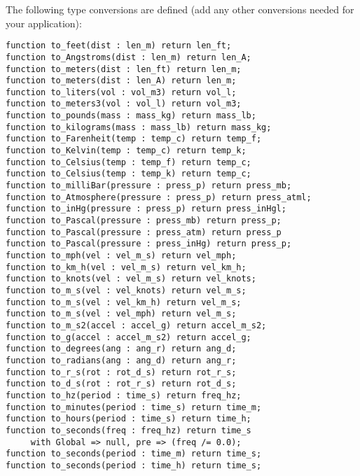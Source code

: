 \documentclass[10pt, openany]{book}
\begin{document}
The following type conversions are defined (add any other conversions needed for your application):
\begin{lstlisting}
function to_feet(dist : len_m) return len_ft;
function to_Angstroms(dist : len_m) return len_A;
function to_meters(dist : len_ft) return len_m;
function to_meters(dist : len_A) return len_m;
function to_liters(vol : vol_m3) return vol_l;
function to_meters3(vol : vol_l) return vol_m3;
function to_pounds(mass : mass_kg) return mass_lb;
function to_kilograms(mass : mass_lb) return mass_kg;
function to_Farenheit(temp : temp_c) return temp_f;
function to_Kelvin(temp : temp_c) return temp_k;
function to_Celsius(temp : temp_f) return temp_c;
function to_Celsius(temp : temp_k) return temp_c;
function to_milliBar(pressure : press_p) return press_mb;
function to_Atmosphere(pressure : press_p) return press_atml;
function to_inHg(pressure : press_p) return press_inHgl;
function to_Pascal(pressure : press_mb) return press_p;
function to_Pascal(pressure : press_atm) return press_p
function to_Pascal(pressure : press_inHg) return press_p;
function to_mph(vel : vel_m_s) return vel_mph;
function to_km_h(vel : vel_m_s) return vel_km_h;
function to_knots(vel : vel_m_s) return vel_knots;
function to_m_s(vel : vel_knots) return vel_m_s;
function to_m_s(vel : vel_km_h) return vel_m_s;
function to_m_s(vel : vel_mph) return vel_m_s;
function to_m_s2(accel : accel_g) return accel_m_s2;
function to_g(accel : accel_m_s2) return accel_g;
function to_degrees(ang : ang_r) return ang_d;
function to_radians(ang : ang_d) return ang_r;
function to_r_s(rot : rot_d_s) return rot_r_s;
function to_d_s(rot : rot_r_s) return rot_d_s;
function to_hz(period : time_s) return freq_hz;
function to_minutes(period : time_s) return time_m;
function to_hours(period : time_s) return time_h;
function to_seconds(freq : freq_hz) return time_s
     with Global => null, pre => (freq /= 0.0);
function to_seconds(period : time_m) return time_s;
function to_seconds(period : time_h) return time_s;
\end{lstlisting}
\end{document}
